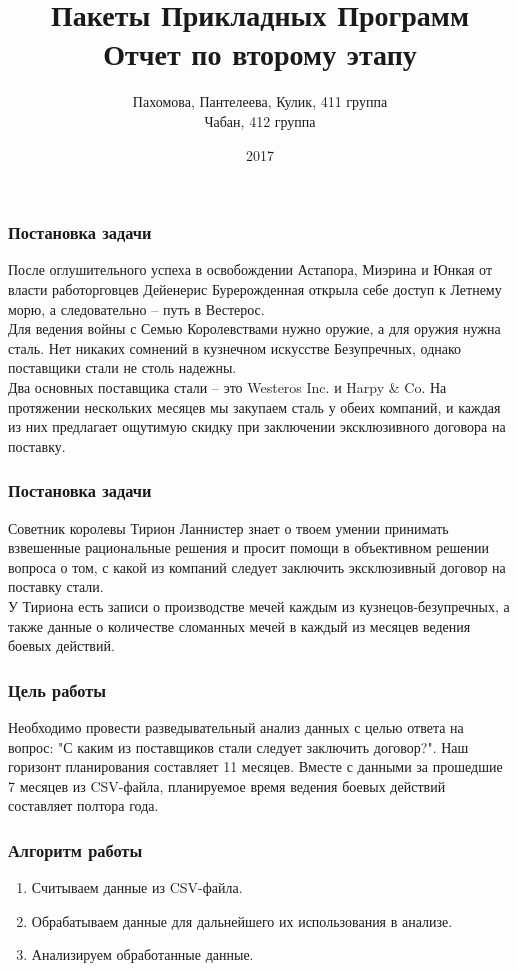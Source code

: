 \documentclass[9pt]{beamer}
\title{Пакеты Прикладных Программ \\ Отчет по второму этапу}
\author{Пахомова, Пантелеева, Кулик, 411 группа\\Чабан, 412 группа}
\institute{МГУ имени М.В. Ломоносова, Москва, Россия}
\date{2017}
\begin{document}
 
\frame{\titlepage}
 
\begin{frame}
\frametitle{Постановка задачи}
После оглушительного успеха в освобождении Астапора, Миэрина и Юнкая от власти работорговцев Дейенерис Бурерожденная открыла себе доступ к Летнему морю, а следовательно -- путь в Вестерос.\\
Для ведения войны с Семью Королевствами нужно оружие, а для оружия нужна сталь. Нет никаких сомнений в кузнечном искусстве Безупречных, однако поставщики стали не столь надежны.\\
Два основных поставщика стали -- это {Westeros Inc.} и {Harpy \& Co}. На протяжении нескольких месяцев мы закупаем сталь у обеих компаний, и каждая из них предлагает ощутимую скидку при заключении эксклюзивного договора на поставку.\\
\end{frame}

\begin{frame}
\frametitle{Постановка задачи}
Советник королевы Тирион Ланнистер знает о твоем умении принимать взвешенные рациональные решения и просит помощи в объективном решении вопроса о том, с какой из компаний следует заключить эксклюзивный договор на поставку стали.\\
У Тириона есть записи о производстве мечей каждым из кузнецов-безупречных, а также данные о количестве сломанных мечей в каждый из месяцев ведения боевых действий.\\
\end{frame}
 
\begin{frame}
\frametitle{Цель работы}
Необходимо провести разведывательный анализ данных с целью ответа на вопрос: "С каким из поставщиков стали следует заключить договор?". Наш горизонт планирования составляет 11 месяцев. Вместе с данными за прошедшие 7 месяцев из CSV-файла, планируемое время ведения боевых действий составляет полтора года.
\end{frame}

\begin{frame}
\frametitle{Алгоритм работы}
\begin{enumerate}
\item Считываем данные из CSV-файла.
\item Обрабатываем данные для дальнейшего их использования в анализе.
\item Анализируем обработанные данные.
\end{enumerate}
\end{frame}
\end{document}
